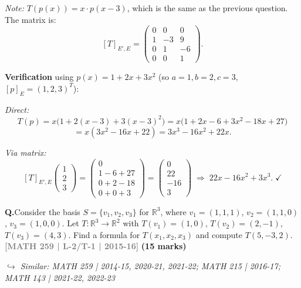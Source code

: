 \documentclass[12pt,a3paper]{article}
\newcommand{\yr}[1]{\hfill\textcolor{gray}{\small\textbf{[#1]}}}
\newcommand{\mk}[1]{\textcolor{orange!70!black}{\small\textbf{(#1 marks)}}}
\newcommand{\variant}[1]{\par\vspace{1pt}\textcolor{blue!50!black}%
  {\footnotesize\textit{$\hookrightarrow$ Similar: #1}}}
\newcounter{qnum}
\newcommand{\Q}[1]{%
  \needspace{4\baselineskip}
  \refstepcounter{qnum}
  \vspace{6pt}
  \noindent\textbf{Q\theqnum.}\enspace #1\par
}
\begin{document}
\begin{tcolorbox}[enhanced,breakable,
  colback=cF!4,colframe=cF,boxrule=0.8pt,arc=5pt,
  title={\textbf{Answer --- $T:P_2\to P_3$, $T(a+bx+cx^2)=x\bigl(a+b(x-3)+c(x-3)^2\bigr)$: Matrix \& Verify}},
  fonttitle=\bfseries\color{white},colbacktitle=cF]

\textit{Note:} $T(p(x))=x\cdot p(x-3)$, which is the same as the previous question. The matrix is:
\[
[T]_{E',E}=\begin{pmatrix}0&0&0\\1&-3&9\\0&1&-6\\0&0&1\end{pmatrix}.
\]

\textbf{Verification} using $p(x)=1+2x+3x^2$ (so $a=1,b=2,c=3$, $[p]_E=(1,2,3)^T$):

\textit{Direct:}
\[
T(p)=x\bigl(1+2(x-3)+3(x-3)^2\bigr)=x\bigl(1+2x-6+3x^2-18x+27\bigr)
\]
\[
=x(3x^2-16x+22)=3x^3-16x^2+22x.
\]

\textit{Via matrix:}
\[
[T]_{E',E}\begin{pmatrix}1\\2\\3\end{pmatrix}=\begin{pmatrix}0\\1-6+27\\0+2-18\\0+0+3\end{pmatrix}=\begin{pmatrix}0\\22\\-16\\3\end{pmatrix}
\;\Rightarrow\; 22x-16x^2+3x^3.\;\checkmark
\]

\end{tcolorbox}

\Q{Consider the basis $S = \{v_1, v_2, v_3\}$ for $\mathbb{R}^3$, where $v_1 = (1,1,1)$, $v_2 = (1,1,0)$, $v_3 = (1,0,0)$. Let $T: \mathbb{R}^3 \to \mathbb{R}^2$ with $T(v_1) = (1,0)$, $T(v_2) = (2,-1)$, $T(v_3) = (4,3)$. Find a formula for $T(x_1,x_2,x_3)$ and compute $T(5,-3,2)$.
\yr{MATH 259 | L-2/T-1 | 2015-16} \mk{15}
\variant{MATH 259 | 2014-15, 2020-21, 2021-22; MATH 215 | 2016-17; MATH 143 | 2021-22, 2022-23}}
\end{document}
